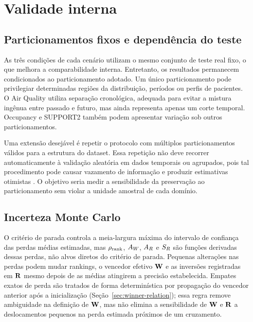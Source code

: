 \section{Validade interna}

\subsection{Particionamentos fixos e dependência do teste}

As três condições de cada cenário utilizam o mesmo conjunto de teste real fixo, o que melhora a comparabilidade interna. Entretanto, os resultados permanecem condicionados ao particionamento adotado. Um único particionamento pode privilegiar determinadas regiões da distribuição, períodos ou perfis de pacientes. O Air Quality utiliza separação cronológica, adequada para evitar a mistura ingênua entre passado e futuro, mas ainda representa apenas um corte temporal. Occupancy e SUPPORT2 também podem apresentar variação sob outros particionamentos.

Uma extensão desejável é repetir o protocolo com múltiplos particionamentos válidos para a estrutura do dataset. Essa repetição não deve recorrer automaticamente à validação aleatória em dados temporais ou agrupados, pois tal procedimento pode causar vazamento de informação e produzir estimativas otimistas \cite{Kaufman2012,Roberts2017,Bergmeir2012}. O objetivo seria medir a sensibilidade da preservação ao particionamento sem violar a unidade amostral de cada domínio.

\subsection{Incerteza Monte Carlo}

O critério de parada controla a meia-largura máxima do intervalo de confiança das perdas médias estimadas, mas $\rho_{\mathrm{rank}}$, $A_W$, $A_R$ e $S_R$ são funções derivadas dessas perdas, não alvos diretos do critério de parada. Pequenas alterações nas perdas podem mudar rankings, o vencedor efetivo $\mathbf{W}$ e as inversões registradas em $\mathbf{R}$ mesmo depois de as médias atingirem a precisão estabelecida. Empates exatos de perda são tratados de forma determinística por propagação do vencedor anterior após a inicialização (Seção~\ref{sec:winner-relation}); essa regra remove ambiguidade na definição de $\mathbf{W}$, mas não elimina a sensibilidade de $\mathbf{W}$ e $\mathbf{R}$ a deslocamentos pequenos na perda estimada próximos de um cruzamento.

